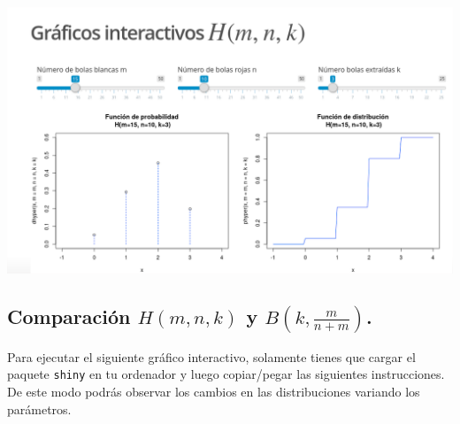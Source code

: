 \documentclass[]{book}
\begin{document}
\href{https://joanby.shinyapps.io/DistribucionesNotables/}{\includegraphics{Images/noshinyImages/interactivos_hiper_geom1.png}}

\hypertarget{comparaciuxf3n-hmnk-y-bleftkfracmnmright.}{%
\subsection{\texorpdfstring{Comparación \(H(m,n,k)\) y \(B\left(k,\frac{m}{n+m}\right)\).}{Comparación H(m,n,k) y B\textbackslash{}left(k,\textbackslash{}frac\{m\}\{n+m\}\textbackslash{}right).}}\label{comparaciuxf3n-hmnk-y-bleftkfracmnmright.}}

Para ejecutar el siguiente gráfico interactivo, solamente tienes que cargar el paquete \texttt{shiny} en tu ordenador y luego copiar/pegar las siguientes instrucciones. De este modo podrás observar los cambios en las distribuciones variando los parámetros.
\end{document}
